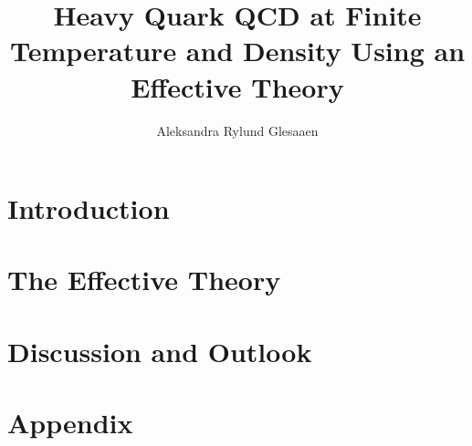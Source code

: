 \documentclass[%
  12pt,%
  twoside,%
  openright,%
  cleardoublepage=empty%
]{scrreprt}
\author{Aleksandra Rylund Glesaaen}
\title{Heavy Quark QCD at Finite Temperature and Density Using an Effective Theory}
\begin{document}



\cleardoublepage


\cleardoublepage
{}
\tableofcontents

\cleardoublepage


\cleardoublepage


\cleardoublepage


\cleardoublepage
{}


\part{Introduction}
\cleardoublepage

\cleardoublepage

\cleardoublepage



\cleardoublepage
\part{The Effective Theory}
\cleardoublepage

\cleardoublepage



\cleardoublepage
\part{Discussion and Outlook}
\cleardoublepage

\cleardoublepage



\cleardoublepage
\appendix
\part{Appendix}
\cleardoublepage

\cleardoublepage



\cleardoublepage



\cleardoublepage

\end{document}
